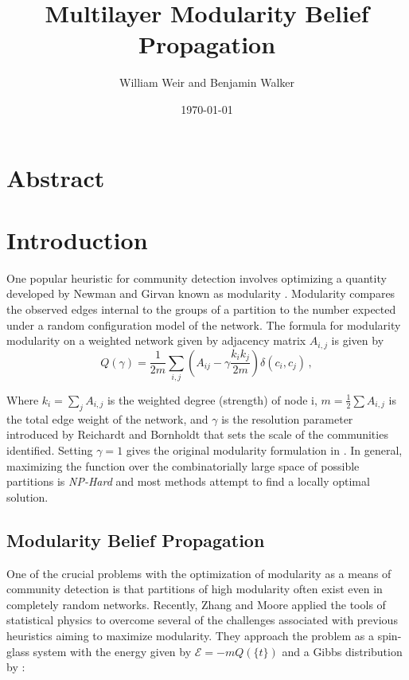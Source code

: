 \documentclass[11pt]{article}
\title{Multilayer Modularity Belief Propagation} %
\author{William Weir and Benjamin Walker}
\date{\today}                                           %
\begin{document}
\maketitle

\section{Abstract} 

\section{Introduction}


One popular heuristic for community detection involves optimizing a quantity developed by Newman and Girvan known as modularity \cite{Newman:2003ep}.  Modularity compares the observed edges internal to the groups of a partition to the number expected under a random configuration model of the network.  The formula for modularity modularity on a weighted network given by adjacency matrix $A_{i,j}$ is given by \cite{Newman:2003ep}
\begin{equation}
\label{eq:mod}
Q(\gamma)=\frac{1}{2m}\sum_{i,j}{\left( A_{ij}-\gamma \frac{k_ik_j}{2m}\right)\delta(c_i,c_j)}\,,
\end{equation}

Where $k_i=\sum_j{A_{i,j}}$ is the weighted degree (strength) of node i, $m=\frac{1}{2}\sum{A_{i,j}}$ is the total edge weight of the network, and $\gamma$ is the resolution parameter introduced by Reichardt and Bornholdt \cite{Reichardt:2006eh} that sets the scale of the communities identified. Setting $\gamma=1$ gives the original modularity formulation in \cite{Newman:2003ep}.  In general, maximizing the function over the combinatorially large space of possible partitions is \emph{NP-Hard} and most methods attempt to find a locally optimal solution. 

\subsection{ Modularity Belief Propagation}
One of the crucial problems with the optimization of modularity as a means of community detection is that partitions of high modularity often exist even in completely random networks.  Recently, Zhang and Moore applied the tools of statistical physics to overcome several of the challenges associated with previous heuristics aiming to maximize modularity\cite{Zhang:2014gea}.  They approach the problem as a spin-glass system with the energy given by $ \mathcal{E}=-mQ(\{t\}) $ and a Gibbs distribution by : 
\end{document}
